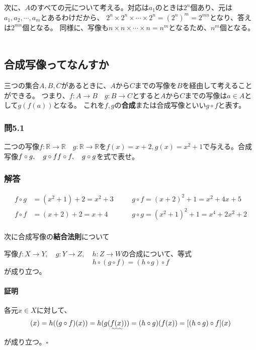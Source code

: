 \documentclass[a4j,dvipdfmx]{jsarticle}
\begin{document}
次に、$A$のすべての元について考える。対応は$a_1$のときは$2^n$個あり、元は$a_1,a_2,\cdots,a_m$とあるわけだから、
$2^n\times 2^n\times\cdots\times 2^n=(2^n)^m=2^{mn}$となり、答えは$2^{mn}$個となる。
同様に、写像も$n\times n\times\cdots\times n=n^m$となるため、$n^m$個となる。\\\\
\color{black}
\newpage
\subsection{合成写像ってなんすか}
三つの集合$A,B,C$があるときに、$A$から$C$までの写像を$B$を経由して考えることができる。
つまり、$f:A\to B\quad g:B\to C$とすると$A$から$C$までの写像は$a\in A$として$g(f(a))$となる。
これを$f,g$の\textbf{合成}または$\textbf{合成写像}$といい$g\circ f$と表す。

\subsubsection*{問5.1}
二つの写像$f:\mathbb{R}\to\mathbb{R}\quad g:\mathbb{R}\to\mathbb{R}$を$f(x)=x+2,g(x)=x^2+1$で与える。合成写像$f\circ g,\quad g\circ f\\f\circ f,\quad g\circ g$を式で表せ。
\vspace{30mm}

\subsubsection*{解答}
\color{red}
\begin{align*}
    f\circ g&=(x^2+1)+2=x^2+3\quad && g\circ f=(x+2)^2+1=x^2+4x+5\\
    f\circ f&=(x+2)+2=x+4\quad && g\circ g=(x^2+1)^2+1=x^4+2x^2+2\\
\end{align*}
\color{black}

次に合成写像の\textbf{結合法則}について
\begin{screen}
    写像$f:X\to Y,\quad g:Y\to Z,\quad h:Z\to W$の合成について、等式
    \begin{equation*}
        h\circ (g\circ f)=(h\circ g)\circ f
    \end{equation*}
    が成り立つ。
\end{screen}
\paragraph{証明}
各元$x\in X$に対して、
\begin{equation*}
    [h\circ (g\circ f)](x)=h((g\circ f)(x))=h(g(\uwave{f(x)}))=(h\circ g)(f(x))=[(h\circ g)\circ f](x)   
\end{equation*}
が成り立つ。$\square$\\ 
\newpage
\end{document}
